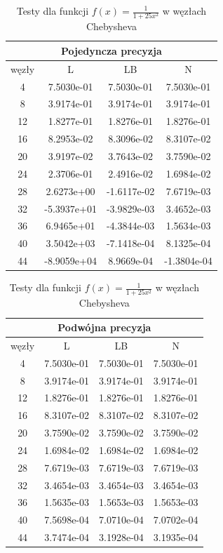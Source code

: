 \documentclass[a4paper]{article}
\begin{document}
\begin{table}[!h]
  \begin{minipage}{.55\linewidth}
    \begin{tabular}{c|ccc}
      \multicolumn{4}{c}{Pojedyncza precyzja}\\
      \hline \hline
      węzły & L & LB & N \\
      \hline
4 & 7.5030e-01 & 7.5030e-01 & 7.5030e-01\\
8 & 3.9174e-01 & 3.9174e-01 & 3.9174e-01\\
12 & 1.8277e-01 & 1.8276e-01 & 1.8276e-01\\
16 & 8.2953e-02 & 8.3096e-02 & 8.3107e-02\\
20 & 3.9197e-02 & 3.7643e-02 & 3.7590e-02\\
24 & 2.3706e-01 & 2.4916e-02 & 1.6984e-02\\
28 & 2.6273e+00 & -1.6117e-02 & 7.6719e-03\\
32 & -5.3937e+01 & -3.9829e-03 & 3.4652e-03\\
36 & 6.9465e+01 & -4.3844e-03 & 1.5634e-03\\
40 & 3.5042e+03 & -7.1418e-04 & 8.1325e-04\\
44 & -8.9059e+04 & 8.9669e-04 & -1.3804e-04\\
    \end{tabular}
  \end{minipage}%
  \begin{minipage}{.55\linewidth}
    \begin{tabular}{c|ccc}
      \multicolumn{4}{c}{Podwójna precyzja}\\
      \hline \hline
      węzły & L & LB & N \\
      \hline
4 & 7.5030e-01 & 7.5030e-01 & 7.5030e-01\\
8 & 3.9174e-01 & 3.9174e-01 & 3.9174e-01\\
12 & 1.8276e-01 & 1.8276e-01 & 1.8276e-01\\
16 & 8.3107e-02 & 8.3107e-02 & 8.3107e-02\\
20 & 3.7590e-02 & 3.7590e-02 & 3.7590e-02\\
24 & 1.6984e-02 & 1.6984e-02 & 1.6984e-02\\
28 & 7.6719e-03 & 7.6719e-03 & 7.6719e-03\\
32 & 3.4654e-03 & 3.4654e-03 & 3.4654e-03\\
36 & 1.5635e-03 & 1.5653e-03 & 1.5653e-03\\
40 & 7.5698e-04 & 7.0710e-04 & 7.0702e-04\\
44 & 3.7474e-04 & 3.1928e-04 & 3.1935e-04\\
    \end{tabular}
  \end{minipage}
  \caption{Testy dla funkcji $f(x) = \frac{1}{1+25x^2}$ w węzłach Chebysheva}
\end{table}
\end{document}

